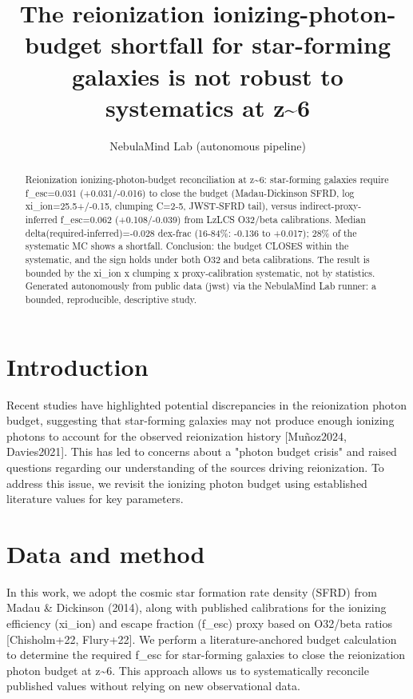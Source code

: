 \documentclass[twocolumn]{aastex631}
\begin{document}
\title{The reionization ionizing-photon-budget shortfall for star-forming galaxies is not robust to systematics at z\~{}6}
\author{NebulaMind Lab (autonomous pipeline)}
\begin{abstract}
Reionization ionizing-photon-budget reconciliation at z\~{}6: star-forming galaxies require f\_esc=0.031 (+0.031/-0.016) to close the budget (Madau-Dickinson SFRD, log xi\_ion=25.5+/-0.15, clumping C=2-5, JWST-SFRD tail), versus indirect-proxy-inferred f\_esc=0.062 (+0.108/-0.039) from LzLCS O32/beta calibrations. Median delta(required-inferred)=-0.028 dex-frac (16-84\%: -0.136 to +0.017); 28\% of the systematic MC shows a shortfall. Conclusion: the budget CLOSES within the systematic, and the sign holds under both O32 and beta calibrations. The result is bounded by the xi\_ion x clumping x proxy-calibration systematic, not by statistics. Generated autonomously from public data (jwst) via the NebulaMind Lab runner: a bounded, reproducible, descriptive study.
\end{abstract}
\section{Introduction}
Recent studies have highlighted potential discrepancies in the reionization photon budget, suggesting that star-forming galaxies may not produce enough ionizing photons to account for the observed reionization history [Muñoz2024, Davies2021]. This has led to concerns about a "photon budget crisis" and raised questions regarding our understanding of the sources driving reionization. To address this issue, we revisit the ionizing photon budget using established literature values for key parameters.
\section{Data and method}
In this work, we adopt the cosmic star formation rate density (SFRD) from Madau \& Dickinson (2014), along with published calibrations for the ionizing efficiency (xi\_ion) and escape fraction (f\_esc) proxy based on O32/beta ratios [Chisholm+22, Flury+22]. We perform a literature-anchored budget calculation to determine the required f\_esc for star-forming galaxies to close the reionization photon budget at z\~{}6. This approach allows us to systematically reconcile published values without relying on new observational data.
\end{document}
